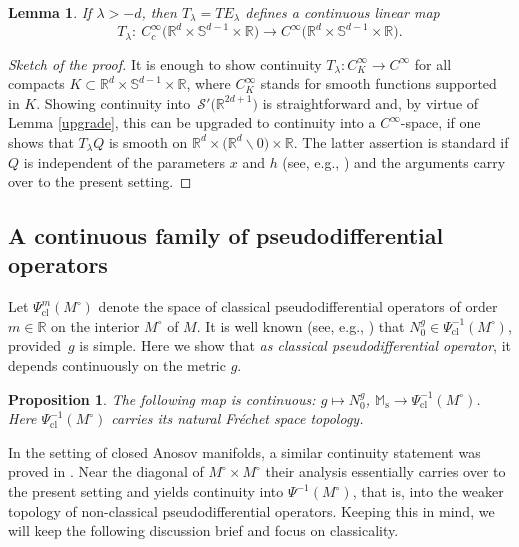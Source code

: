 \documentclass[pdftex]{sigma}
\numberwithin{equation}{section}
\newtheorem{Lemma}[Theorem]{Lemma}
\newtheorem{Proposition}[Theorem]{Proposition}
\theoremstyle{definition}
\newcommand{\R}{\mathbb{R}} %
\newcommand{\M}{\mathbb{M}}
\newcommand{\Ms}{\M_{\mathrm{s}}}
\newcommand{\1}{{\bf 1}}
\newcommand{\cl}{\mathrm{cl}}
\begin{document}
\begin{Lemma}\label{tlambda}
	If $\lambda>-d$, then $T_\lambda=T E_\lambda$ defines a continuous linear map
	\[
	T_\lambda\colon\ C_c^\infty\bigl(\R^d\times \mathbb S^{d-1}\times \R\bigr) \rightarrow C^\infty\bigl(\R^d\times \mathbb S^{d-1}\times \R\bigr).
	\]	
\end{Lemma}

\begin{proof}[Sketch of the proof]
It is enough to show continuity $T_\lambda\colon C_K^\infty\to C^\infty$ for all compacts $K\subset \R^d\times \mathbb S^{d-1} \times \R$, where $C^\infty_K$ stands for smooth functions supported in $K$. Showing continuity into~$\mathcal S'\bigl(\R^{2d+1}\bigr)$ is straightforward and, by virtue of Lemma \ref{upgrade}, this can be upgraded to continuity into a $C^\infty$-space, if one shows that $T_\lambda Q$ is smooth on $\R^d\times \bigl(\R^d\backslash 0\bigr) \times \R$. The latter assertion is standard if $Q$ is independent of the parameters $x$ and $h$ (see, e.g., \cite[Section~7.4]{Ste93}) and the arguments carry over to the present setting.
\end{proof}

\subsection{A continuous family of pseudodifferential operators}\label{ctspsido}
 Let $\Psi^m_\cl(M^\circ)$ denote the space of classical pseudodifferential operators of order $m\in \R$ on the interior $M^\circ$ of $M$. It is well known (see, e.g., \cite[Theorem~8.1.1]{PSU23}) that
$
N_0^g\in \Psi^{-1}_\cl(M^\circ)$,
provided~$g$ is simple. Here we show that {\it as classical pseudodifferential operator}, it depends continuously on the metric $g$.

\begin{Proposition}\label{claim2}
The following map is continuous:
$
g\mapsto N_0^g$, $ \Ms \rightarrow \Psi^{-1}_\cl(M^\circ)$.
Here $\Psi^{-1}_\cl(M^\circ)$ carries its natural Fr{\'e}chet space topology.
\end{Proposition}


In the setting of closed Anosov manifolds, a similar continuity statement was proved in \cite[Proposition~4.1]{GKL22}. Near the diagonal of $M^\circ \times M^\circ$ their analysis essentially carries over to the present setting and yields continuity into $\Psi^{-1}(M^\circ)$, that is, into the weaker topology of non-classical pseudodifferential operators. Keeping this in mind, we will keep the following discussion brief and focus on classicality.
\end{document}
